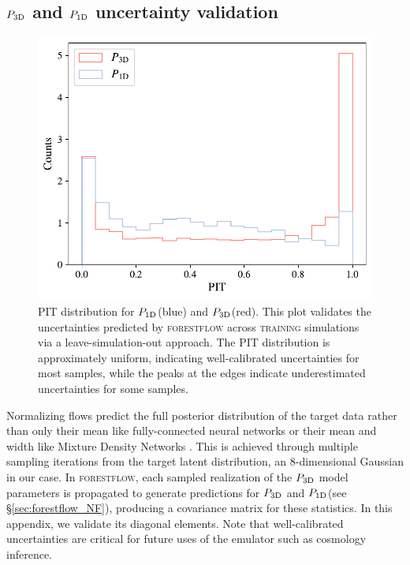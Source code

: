 \documentclass{aa}
\newcommand{\poned}{\ensuremath{P_{\rm 1D}}\xspace}
\newcommand{\pthreed}{\ensuremath{P_{\rm 3D}}\xspace}
\newcommand{\forestflow}{\textsc{forestflow}\xspace}
\newcommand{\lacehc}{\textsc{training}\xspace}
\begin{document}
\begin{appendix}

\section{\pthreed and \poned uncertainty validation}
\label{sec:uncertainty_validation}

\begin{figure}
    \centering\includegraphics[width=\columnwidth]{figures/PIT_P3D.pdf}
    \caption{PIT distribution for \poned (blue) and \pthreed (red). This plot validates the uncertainties predicted by \forestflow across \lacehc simulations via a leave-simulation-out approach. The PIT distribution is approximately uniform, indicating well-calibrated uncertainties for most samples, while the peaks at the edges indicate underestimated uncertainties for some samples.}
    \label{fig:PIT}
\end{figure}

Normalizing flows predict the full posterior distribution of the target data rather than only their mean like fully-connected neural networks or their mean and width like Mixture Density Networks \citep[see][for some applications in cosmology]{ramachandra2022MachineLearningSynthetic, cabayol-garcia2023NeuralNetworkEmulator}. This is achieved through multiple sampling iterations from the target latent distribution, an 8-dimensional Gaussian in our case. In \forestflow, each sampled realization of the \pthreed model parameters is propagated to generate predictions for \pthreed and \poned (see \S\ref{sec:forestflow_NF}), producing a covariance matrix for these statistics. In this appendix, we validate its diagonal elements. Note that well-calibrated uncertainties are critical for future uses of the emulator such as cosmology inference.


\end{appendix}
\end{document}
